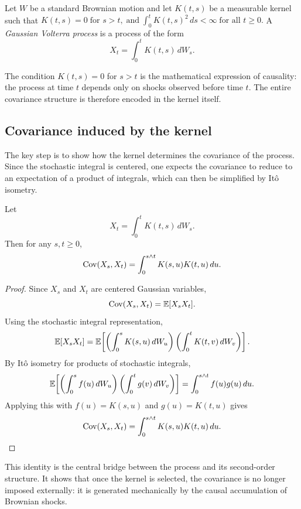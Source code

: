 \begin{definition}
Let \(W\) be a standard Brownian motion and let \(K(t,s)\) be a measurable kernel such that
\(
K(t,s)=0 \; \text{for } s>t,
\; \text{and}  \;
\int_0^t K(t,s)^2\,ds<\infty
\; \text{for all } t\ge 0.
\)
A \emph{Gaussian Volterra process} is a process of the form
\[
X_t=\int_0^t K(t,s)\,dW_s.
\]
\end{definition}

The condition \(K(t,s)=0\) for \(s>t\) is the mathematical expression of causality: the process at time \(t\) depends only on shocks observed before time \(t\). The entire covariance structure is therefore encoded in the kernel itself.

\subsection{Covariance induced by the kernel}

The key step is to show how the kernel determines the covariance of the process. Since the stochastic integral is centered, one expects the covariance to reduce to an expectation of a product of integrals, which can then be simplified by It\^o isometry.

\begin{proposition}
Let
\[
X_t=\int_0^t K(t,s)\,dW_s.
\]
Then for any \(s,t\ge 0\),
\[
\operatorname{Cov}(X_s,X_t)
=
\int_0^{s\wedge t} K(s,u)K(t,u)\,du.
\]
\end{proposition}

\begin{proof}
Since \(X_s\) and \(X_t\) are centered Gaussian variables,
\[
\operatorname{Cov}(X_s,X_t)=\mathbb{E}[X_sX_t].
\]
Using the stochastic integral representation,
\[
\mathbb{E}[X_sX_t]
=
\mathbb{E}\!\left[
\left(\int_0^s K(s,u)\,dW_u\right)
\left(\int_0^t K(t,v)\,dW_v\right)
\right].
\]
By It\^o isometry for products of stochastic integrals,
\[
\mathbb{E}\!\left[
\left(\int_0^s f(u)\,dW_u\right)
\left(\int_0^t g(v)\,dW_v\right)
\right]
=
\int_0^{s\wedge t} f(u)g(u)\,du.
\]
Applying this with \(f(u)=K(s,u)\) and \(g(u)=K(t,u)\) gives
\[
\operatorname{Cov}(X_s,X_t)
=
\int_0^{s\wedge t} K(s,u)K(t,u)\,du. \qedhere
\]
\end{proof}
    
This identity is the central bridge between the process and its second-order structure. It shows that once the kernel is selected, the covariance is no longer imposed externally: it is generated mechanically by the causal accumulation of Brownian shocks.

